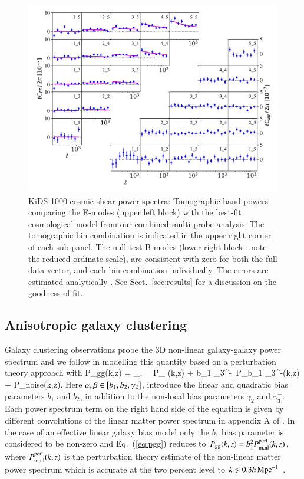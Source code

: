 \begin{figure}
        \includegraphics[width=\textwidth]{Data_Plots/Pkk/Pkk_K1000_2Dbins_v2_goldclasses_Flag_SOM_Fid_C.pdf}
        \caption{KiDS-1000 cosmic shear power spectra:  Tomographic
          band powers comparing the E-modes (upper left block) with the best-fit
          cosmological model from our combined multi-probe analysis.  The tomographic
        bin combination is indicated in the upper right corner of each
      sub-panel.  The null-test B-modes (lower right block - note the reduced ordinate scale), are
      consistent with zero for both the full data vector, and each
     bin combination individually.   The errors are estimated analytically \citep{joachimi/etal:inprep}.  See Sect.~\ref{sec:results} for a discussion on the goodness-of-fit.}
        \label{fig:Pkk}
\end{figure}


\subsection{Anisotropic galaxy clustering}
\label{sec:clustering}
Galaxy clustering observations probe the 3D non-linear galaxy-galaxy power spectrum and we follow \citet{sanchez/etal:2017} in modelling this quantity based on a perturbation theory approach with
\be
\label{eq:pgg}
P_{\rm gg}(k,z) = \sum_{\alpha,\beta} \alpha\, \beta\, P_{\alpha
  \beta}(k,z) + b_1 \gamma_3^-\, P_{b_1 \gamma_3^-}(k,z) + P_{\rm noise}(k,z)\;.
\ee
Here $\alpha,\beta \in \left[ b_1, b_2, \gamma_2 \right]$, introduce the linear and quadratic bias parameters $b_1$ and $b_2$, in addition to the non-local bias parameters $ \gamma_2$ and $\gamma_3^-$.  Each power spectrum term on the right hand side of the equation is given by different convolutions of the linear matter power spectrum in appendix A of \citet{sanchez/etal:2017}.   In the case of an effective linear galaxy bias model \citep[see for example][]{vanuitert/etal:2018, abbott/etal:2018} only the $b_1$ bias parameter is considered to be non-zero and Eq.~(\ref{eq:pgg}) reduces to $P_{\rm gg}(k,z) =b_1^2 P_{\rm m, nl}^{\rm pert}(k,z)$, where $P_{\rm m, nl}^{\rm pert}(k,z)$ is the perturbation theory estimate of the non-linear matter power spectrum which is accurate at the two percent level to $k \lesssim 0.3 h \,{\rm Mpc}^{-1}$ \citep{sanchez/etal:2017}. 

